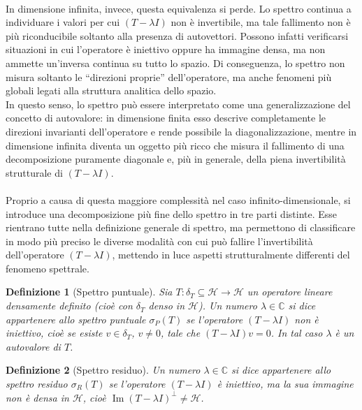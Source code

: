 \documentclass[a4paper,12pt]{report}
\newtheorem{definizione}{Definizione}[chapter]
\begin{document}
\\In dimensione infinita, invece, questa equivalenza si perde. Lo spettro continua a individuare i valori per cui $(T-\lambda I)$ non è invertibile, ma tale fallimento non è più riconducibile soltanto alla presenza di autovettori. Possono infatti verificarsi situazioni in cui l’operatore è iniettivo oppure ha immagine densa, ma non ammette un’inversa continua su tutto lo spazio. Di conseguenza, lo spettro non misura soltanto le “direzioni proprie” dell’operatore, ma anche fenomeni più globali legati alla struttura analitica dello spazio.
\\In questo senso, lo spettro può essere interpretato come una generalizzazione del concetto di autovalore: in dimensione finita esso descrive completamente le direzioni invarianti dell’operatore e rende possibile la diagonalizzazione, mentre in dimensione infinita diventa un oggetto più ricco che misura il fallimento di una decomposizione puramente diagonale e, più in generale, della piena invertibilità strutturale di $(T-\lambda I)$.
\\
\\Proprio a causa di questa maggiore complessità nel caso infinito-dimensionale, si introduce una decomposizione più fine dello spettro in tre parti distinte. Esse rientrano tutte nella definizione generale di spettro, ma permettono di classificare in modo più preciso le diverse modalità con cui può fallire l’invertibilità dell’operatore $(T-\lambda I)$, mettendo in luce aspetti strutturalmente differenti del fenomeno spettrale.

\begin{definizione}[Spettro puntuale]
Sia $T : \delta_T\subseteq \mathscr{H} \to \mathscr{H}$ un operatore lineare densamente definito (cioè con $\delta_T $ denso in $\mathscr{H}$). Un numero $\lambda \in \mathbb{C}$ si dice appartenere allo spettro puntuale $\sigma_P(T)$ se l’operatore $(T-\lambda I)$ non è iniettivo, cioè se esiste $v \in \delta_T$, $v \neq 0$, tale che $(T-\lambda I)v = 0$. In tal caso $\lambda$ è un autovalore di $T$.
\end{definizione}

\begin{definizione}[Spettro residuo]
Un numero $\lambda \in \mathbb{C}$ si dice appartenere allo spettro residuo $\sigma_R(T)$ se l’operatore $(T-\lambda I)$ è iniettivo, ma la sua immagine non è densa in $\mathscr{H}$, cioè
$\operatorname{Im}(T-\lambda I)^\perp  \neq \mathscr{H}$.

\end{definizione}
\end{document}
